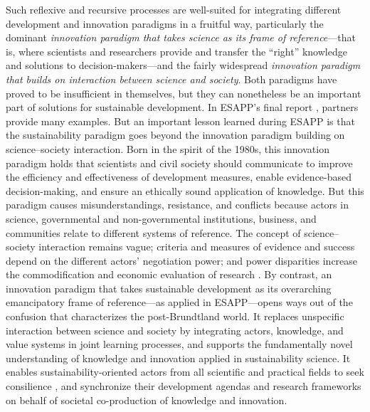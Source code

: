 \documentclass[10pt,a4paper]{article}
\begin{document}
\begin{multicols}{2}
Such reflexive and recursive processes are well-suited for integrating different development and innovation paradigms in a fruitful way, particularly the dominant \textit{innovation paradigm that takes science as its frame of reference}---that is, where scientists and researchers provide and transfer the ``right'' knowledge and solutions to decision-makers---and the fairly widespread \textit{innovation paradigm that builds on interaction between science and society}. Both paradigms have proved to be insufficient in themselves, but they can nonetheless be an important part of solutions for sustainable development. In ESAPP's final report \citep{r58}, partners provide many examples. But an important lesson learned during ESAPP is that the sustainability paradigm goes beyond the innovation paradigm building on science–society interaction. Born in the spirit of the 1980s, this innovation paradigm holds that scientists and civil society should communicate to improve the efficiency and effectiveness of development measures, enable evidence-based decision-making, and ensure an ethically sound application of knowledge. But this paradigm causes misunderstandings, resistance, and conflicts because actors in science, governmental and non-governmental institutions, business, and communities relate to different systems of reference. The concept of science–society interaction remains vague; criteria and measures of evidence and success depend on the different actors' negotiation power; and power disparities increase the commodification and economic evaluation of research \citep{r49}. By contrast, an innovation paradigm that takes sustainable development as its overarching emancipatory frame of reference---as applied in ESAPP---opens ways out of the confusion that characterizes the post-Brundtland world. It replaces unspecific interaction between science and society by integrating actors, knowledge, and value systems in joint learning processes, and supports the fundamentally novel understanding of knowledge and innovation applied in sustainability science. It enables sustainability-oriented actors from all scientific and practical fields to seek consilience \citep{r34}, and synchronize their development agendas and research frameworks on behalf of societal co-production of knowledge and innovation.


\end{multicols}
\end{document}
